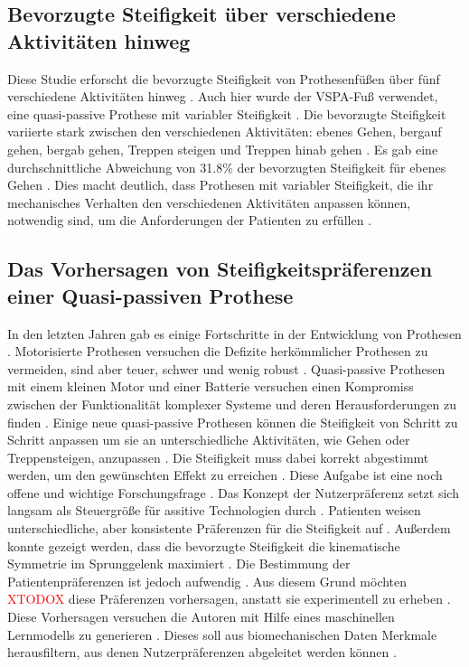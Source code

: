 \subsection{Bevorzugte Steifigkeit über verschiedene Aktivitäten hinweg}
Diese Studie erforscht die bevorzugte Steifigkeit von Prothesenfüßen über fünf verschiedene Aktivitäten hinweg \cite{InstituteofElectricalandElectronicsEngineers.2024}. Auch hier wurde der VSPA-Fuß verwendet, eine quasi-passive Prothese mit variabler Steifigkeit \cite{InstituteofElectricalandElectronicsEngineers.2024}. Die bevorzugte Steifigkeit variierte stark zwischen den verschiedenen Aktivitäten: ebenes Gehen, bergauf gehen, bergab gehen, Treppen steigen und Treppen hinab gehen \cite{InstituteofElectricalandElectronicsEngineers.2024}. Es gab eine durchschnittliche Abweichung von 31.8\% der bevorzugten Steifigkeit für ebenes Gehen \cite{InstituteofElectricalandElectronicsEngineers.2024}. Dies macht deutlich, dass Prothesen mit variabler Steifigkeit, die ihr mechanisches Verhalten den verschiedenen Aktivitäten anpassen können, notwendig sind, um die Anforderungen der Patienten zu erfüllen \cite{InstituteofElectricalandElectronicsEngineers.2024}.

\subsection{Das Vorhersagen von Steifigkeitspräferenzen einer Quasi-passiven Prothese}
In den letzten Jahren gab es einige Fortschritte in der Entwicklung von Prothesen \cite{Shetty.2022}. Motorisierte Prothesen versuchen die Defizite herkömmlicher Prothesen zu vermeiden, sind aber teuer, schwer und wenig robust \cite{Shetty.2022}. Quasi-passive Prothesen mit einem kleinen Motor und einer Batterie versuchen einen Kompromiss zwischen der Funktionalität komplexer Systeme und deren Herausforderungen zu finden \cite{Shetty.2022}. 
Einige neue quasi-passive Prothesen können die Steifigkeit von Schritt zu Schritt anpassen um sie an unterschiedliche Aktivitäten, wie Gehen oder Treppensteigen, anzupassen \cite{Shetty.2022}. Die Steifigkeit muss dabei korrekt abgestimmt werden, um den gewünschten Effekt zu erreichen \cite{Shetty.2022}. Diese Aufgabe ist eine noch offene und wichtige Forschungsfrage \cite{Shetty.2022}. Das Konzept der Nutzerpräferenz setzt sich langsam als Steuergröße für assitive Technologien durch \cite{Shetty.2022}. Patienten weisen unterschiedliche, aber konsistente Präferenzen für die Steifigkeit auf \cite{Shetty.2022}. Außerdem konnte gezeigt werden, dass die bevorzugte Steifigkeit die kinematische Symmetrie im Sprunggelenk maximiert \cite{Shetty.2022}. Die Bestimmung der Patientenpräferenzen ist jedoch aufwendig \cite{Shetty.2022}. Aus diesem Grund möchten \textcolor{red}{XTODOX} diese Präferenzen vorhersagen, anstatt sie experimentell zu erheben \cite{Shetty.2022}. Diese Vorhersagen versuchen die Autoren mit Hilfe eines maschinellen Lernmodells zu generieren \cite{Shetty.2022}. Dieses soll aus biomechanischen Daten Merkmale herausfiltern, aus denen Nutzerpräferenzen abgeleitet werden können \cite{Shetty.2022}. 

